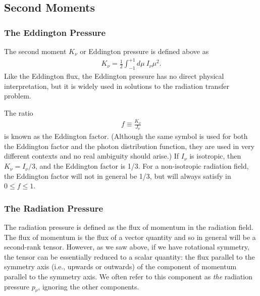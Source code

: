 \newslide

\subsection{Second Moments}

\newslide

\subsubsection{The Eddington Pressure}

The second moment $K_\nu$ or Eddington pressure is defined above as
\begin{align}
K_\nu = \frac{1}{2} \int_{-1}^{+1}\!\!\!d\mu\:I_\nu\mu^2.
\end{align}
Like the Eddington flux,
the Eddington pressure has no direct physical
interpretation, but it is widely used in solutions to the
radiation transfer problem. 

The ratio
\begin{align}
f \equiv \frac{K_\nu}{J_\nu}
\end{align}
is known as the Eddington factor. (Although the same symbol is used for
both the Eddington factor and the photon distribution function, they are
used in very different contexts and no real ambiguity should arise.) If
$I_\nu$ is isotropic, then $K_\nu = I_\nu / 3$, and the Eddington factor
is 1/3. For a non-isotropic radiation field, the Eddington factor will
not in general be 1/3, but will always satisfy in $0
\le f \le 1$.

\newslide

\subsubsection{The Radiation Pressure}

The radiation pressure is defined as the flux of momentum in the
radiation field. The flux of momentum is the flux of a vector quantity
and so in general will be a second-rank tensor. However, as we saw
above, if we have rotational symmetry, the tensor can be essentially
reduced to a scalar quantity: the flux parallel to the symmetry axis
(i.e., upwards or outwards) of the component of momentum parallel to the
symmetry axis. We often refer to this component as \emph{the} radiation pressure $p_\nu$, ignoring the other components.
 
\newslide

